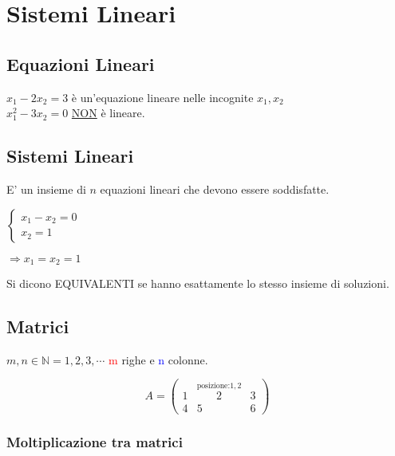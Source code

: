 
\section{Sistemi Lineari}

\subsection{Equazioni Lineari}

\centering\( x_1 - 2x_2 = 3\) \textsf{\small è un'equazione lineare  nelle incognite $x_1, x_2$} \\
\( x_1^2 - 3x_2 = 0\) \textsf{\small \underline{NON} è lineare.}
\vspace{-5mm} %
\subsection{Sistemi Lineari}
\textsf{\small E' un insieme di $n$ equazioni lineari che devono essere soddisfatte.}

\noindent\begin{minipage}{.2\linewidth}
\(
\begin{cases*}
x_1 - x_2 = 0 \\
x_2 = 1
\end{cases*}
\)
\end{minipage}
\begin{minipage}{.2\linewidth}
\(
\Rightarrow x_1 = x_2 = 1
\)
\end{minipage}

\textsf{\small Si dicono EQUIVALENTI se hanno esattamente lo stesso insieme di soluzioni.}
\vspace{-3mm}
\subsection{Matrici}

\( m, n \in \mathbb{N} = {1, 2, 3, \cdots}\)
\textsf{\small \textcolor{red}{m} righe e \textcolor{blue}{n} colonne.}

\[
A = 
\begin{pmatrix}
	1 & \overset{\text{posizione:} 1,2}{2} & 3 \\
	4 & 5 & 6 
\end{pmatrix}
\]

\subsubsection{Moltiplicazione tra matrici}

